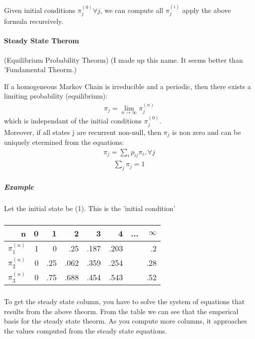 Given initial conditions $\pi_j^{(0)} \forall j$, we can compute all
$\pi_j^{(i)}$ apply the above formula recursively.

\paragraph{Steady State Therom} (Equilibrium Probability Theorm) (I made up this name. It seems better
than 'Fundamental Theorm.)

If a homogeneous Markov Chain is irreducible and a periodic, then there exists a
limiting probability (equilibrium):
\begin{equation*} \begin{split}
	\pi_j = \lim_{n \to \infty} \pi_j^{(n)}
\end{split} \end{equation*}
which is independant of the initial conditions $\pi_j^{(0)}$. \\[0.5cm]

Moreover, if all states j are recurrent non-null, then $\pi_j$ is non zero and
can be uniquely etermined from the equations:
\begin{equation*} \begin{split}
	\pi_j = \sum_i p_{ij} \pi_i , \forall j
\end{split} \end{equation*}
\begin{equation*} \begin{split}
	\sum_j \pi_j = 1
\end{split} \end{equation*}

\subparagraph{Example}
\subparagraph*{}


\subparagraph*{}
Let the initial state be (1). This is the 'initial condition'

\subparagraph*{}
\begin{tabular}{ r | r  | r  |  r  |  r  |  r  |  r   | r }
	  n & 0 & 1  & 2  & 3  & 4  & ...  & $\infty$ \\
	\hline
	$\pi_1^{(n)}$ & 1 & 0    & .25   & .187  & .203  &  & .2 \\
	$\pi_2^{(n)}$ & 0 & .25  & .062  & .359  & .254  &  & .28 \\
	$\pi_3^{(n)}$ & 0 & .75  & .688  & .454  & .543  &  & .52 \\
\end{tabular}

\subparagraph*{}
To get the steady state column, you have to solve the system of equations that
results from the above theorm. From the table we can see that the emperical
basis for the steady state theorm. As you compute more columns, it approaches the values
computed from the steady state equations.


